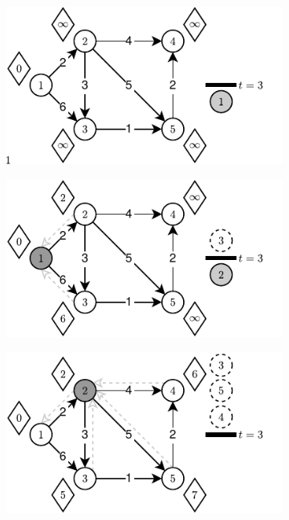 \begin{figure}[!h]
	\centering
	\begin{subfigure}[b]{0.32\textwidth}
		\includegraphics[width=\textwidth]{Chapter_III/THRESHOLD-Example/a.pdf}
		\caption{}
	\end{subfigure}
	\begin{subfigure}[b]{0.32\textwidth}
		\includegraphics[width=\textwidth]{Chapter_III/THRESHOLD-Example/b.pdf}
		\caption{}
	\end{subfigure}
	\begin{subfigure}[b]{0.32\textwidth}
		\includegraphics[width=\textwidth]{Chapter_III/THRESHOLD-Example/c.pdf}

\end{subfigure}
\end{figure}
